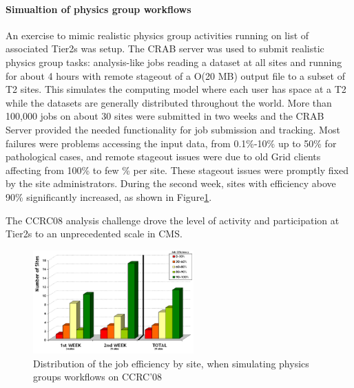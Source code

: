 \paragraph{Simualtion of physics group workflows}
An exercise to mimic realistic physics group activities running
on list of associated Tier2s was setup. 
The CRAB server was used to submit realistic physics group tasks: 
analysis-like jobs reading a dataset at all sites and running for 
about 4 hours with remote stageout of a O(20 MB) output file to a subset of T2
sites. This simulates the computing model where each user has space at a T2 while the datasets are generally distributed throughout the world.
More than 100,000 jobs on about 30 sites were submitted in two weeks and 
the CRAB Server provided the needed functionality for job submission and 
tracking. %
Most failures were problems accessing the input data, from 0.1\%-10\% up to 50\% for pathological cases, and remote stageout issues were due to old Grid clients affecting from 100\% to few \% per site. These stageout issues were
promptly fixed by the site administrators. 
During the second week, sites with efficiency above 90\% significantly increased, as shown in Figure\ref{fig:CCRC08SiteEff}.

The CCRC08 analysis challenge drove the level of activity and participation at Tier2s to an unprecedented scale in CMS.

\begin{figure}
\centering
\includegraphics[width=0.55\textwidth]{figures/CCRC08SiteEff.png}
\caption{Distribution of the job efficiency by site, when simulating physics
groups workflows on CCRC’08}
\label{fig:CCRC08SiteEff}
\end{figure}

